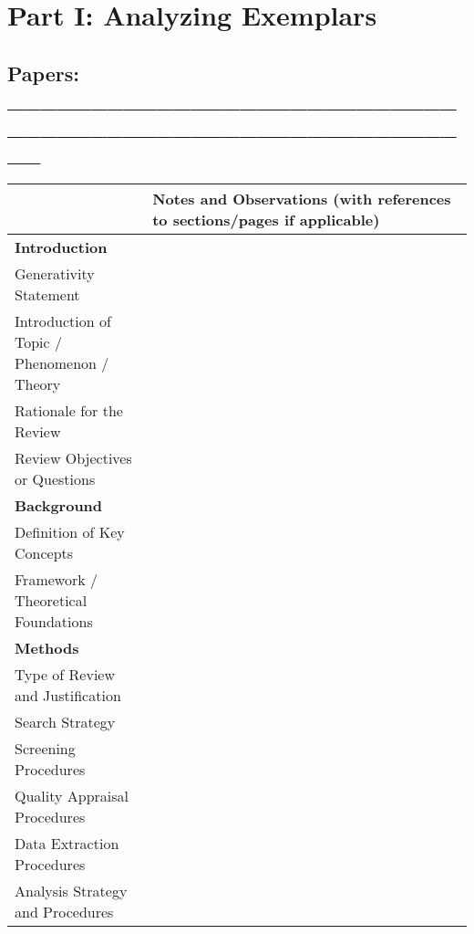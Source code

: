 \documentclass[11pt]{scrartcl}
\theoremstyle{aufgabenstyle}
\begin{document}
	
\section*{Part I: Analyzing Exemplars}

\subsection*{Papers: \_\_\_\_\_\_\_\_\_\_\_\_\_\_\_\_\_\_\_\_\_\_\_\_\_\_\_\_\_\_\_\_\_\_\_\_\_\_\_\_\_\_\_\_\_\_\_\_\_\_\_\_\_\_\_\_}

\renewcommand{\arraystretch}{1.9}

{\small
	\begin{longtable}{|p{0.3\linewidth}|p{0.7\linewidth}|}
		\hline
		 & \textbf{Notes and Observations} (with references to sections/pages if applicable) \\
		\hline
		\textbf{Introduction} & \\
		Generativity Statement & \\[1.5em]
		Introduction of Topic / \newline  Phenomenon / Theory & \\[1.5em]
		Rationale for the Review & \\[1.5em]
		Review Objectives or Questions & \\[1.5em]
		\hline
		\textbf{Background} & \\
		Definition of Key Concepts & \\[1.5em]
		Framework / Theoretical \newline Foundations & \\[1.5em]
		\hline
		\textbf{Methods} & \\
		Type of Review and Justification & \\[1.5em]
		Search Strategy & \\[1.5em]
		Screening Procedures & \\[1.5em]
		Quality Appraisal Procedures & \\[1.5em]
		Data Extraction Procedures & \\[1.5em]
		Analysis Strategy and Procedures & \\[1.5em]
		\hline

	\end{longtable}
}

\vspace{1cm}
\end{document}
